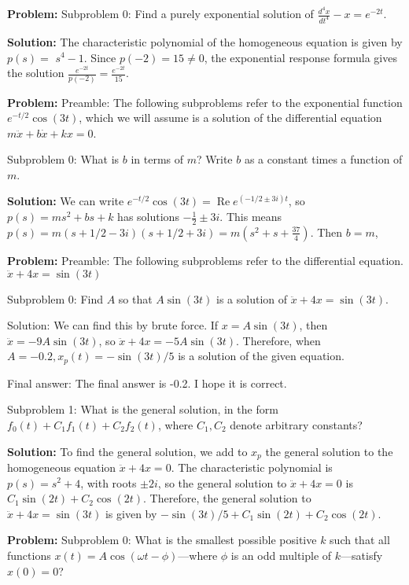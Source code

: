 \documentclass[10pt]{article}
\begin{document}
\textbf{Problem:}
Subproblem 0: Find a purely exponential solution of $\frac{d^{4} x}{d t^{4}}-x=e^{-2 t}$.


\textbf{Solution:}
The characteristic polynomial of the homogeneous equation is given by $p(s)=$ $s^{4}-1$. Since $p(-2)=15 \neq 0$, the exponential response formula gives the solution $\frac{e^{-2 t}}{p(-2)}=\boxed{\frac{e^{-2 t}}{15}}$.


\textbf{Problem:}
Preamble: The following subproblems refer to the exponential function $e^{-t / 2} \cos (3 t)$, which we will assume is a solution of the differential equation $m \ddot{x}+b \dot{x}+k x=0$. 

Subproblem 0: What is $b$ in terms of $m$? Write $b$ as a constant times a function of $m$.


\textbf{Solution:}
We can write $e^{-t / 2} \cos (3 t)=\operatorname{Re} e^{(-1 / 2 \pm 3 i) t}$, so $p(s)=m s^{2}+b s+k$ has solutions $-\frac{1}{2} \pm 3 i$. This means $p(s)=m(s+1 / 2-3 i)(s+1 / 2+3 i)=m\left(s^{2}+s+\frac{37}{4}\right)$. Then $b=\boxed{m}$, 


\textbf{Problem:}
Preamble: The following subproblems refer to the differential equation. $\ddot{x}+4 x=\sin (3 t)$

Subproblem 0: Find $A$ so that $A \sin (3 t)$ is a solution of $\ddot{x}+4 x=\sin (3 t)$.


Solution: We can find this by brute force. If $x=A \sin (3 t)$, then $\ddot{x}=-9 A \sin (3 t)$, so $\ddot{x}+4 x=-5 A \sin (3 t)$. Therefore, when $A=\boxed{-0.2}, x_{p}(t)=-\sin (3 t) / 5$ is a solution of the given equation.

Final answer: The final answer is -0.2. I hope it is correct.

Subproblem 1: What is the general solution, in the form $f_0(t) + C_1f_1(t) + C_2f_2(t)$, where $C_1, C_2$ denote arbitrary constants? 


\textbf{Solution:}
To find the general solution, we add to $x_{p}$ the general solution to the homogeneous equation $\ddot{x}+4 x=0$. The characteristic polynomial is $p(s)=s^{2}+4$, with roots $\pm 2 i$, so the general solution to $\ddot{x}+4 x=0$ is $C_{1} \sin (2 t)+C_{2} \cos (2 t)$. Therefore, the general solution to $\ddot{x}+4 x=\sin (3 t)$ is given by $\boxed{-\sin (3 t) / 5+ C_{1} \sin (2 t)+C_{2} \cos (2 t)}$.


\textbf{Problem:}
Subproblem 0: What is the smallest possible positive $k$ such that all functions $x(t)=A \cos (\omega t-\phi)$---where $\phi$ is an odd multiple of $k$---satisfy $x(0)=0$? \\
\end{document}
